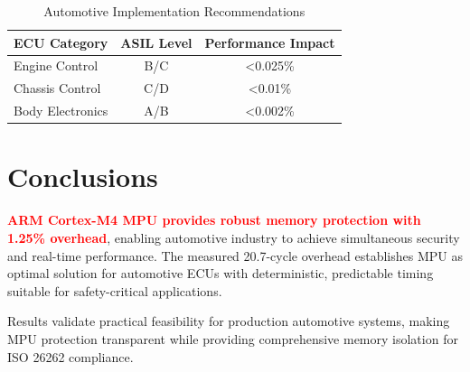 \documentclass[12pt,a4paper,oneside]{report}
\newcommand{\keyresult}[1]{\textbf{\textcolor{red}{#1}}}
\begin{document}
\begin{table}[h]
\centering
\caption{Automotive Implementation Recommendations}
\begin{tabular}{@{}lcc@{}}
\toprule
ECU Category & ASIL Level & Performance Impact \\
\midrule
Engine Control & B/C & <0.025\% \\
Chassis Control & C/D & <0.01\% \\
Body Electronics & A/B & <0.002\% \\
\bottomrule
\end{tabular}
\end{table}

\section{Conclusions}

\keyresult{ARM Cortex-M4 MPU provides robust memory protection with 1.25\% overhead}, enabling automotive industry to achieve simultaneous security and real-time performance. The measured 20.7-cycle overhead establishes MPU as optimal solution for automotive ECUs with deterministic, predictable timing suitable for safety-critical applications.

Results validate practical feasibility for production automotive systems, making MPU protection transparent while providing comprehensive memory isolation for ISO 26262 compliance.

\newpage
{}
{}

\end{document}
